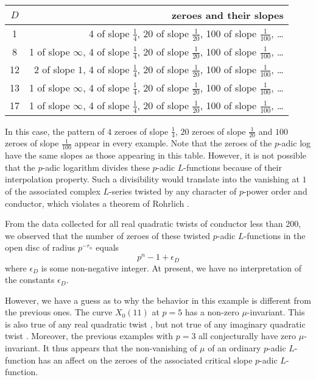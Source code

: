 \documentclass{amsart}
\theoremstyle{plain}
\theoremstyle{definition}
\begin{document}
\vspace{.2cm}

\begin{center}
\begin{tabular}{|c|r|}
\hline
$D$ & zeroes and their slopes\\
\hline
1 &
4 of slope $\frac{1}{4}$, 20  of slope $\frac{1}{20}$, 100  of slope $\frac{1}{100}$, \dots \\
\hline
8 &
1  of slope $\infty$, 4  of slope $\frac{1}{4}$, 20  of slope $\frac{1}{20}$, 100  of slope $\frac{1}{100}$, \dots \\
\hline
12 &
2 of slope $1$, 4 of slope $\frac{1}{4}$, 20  of slope $\frac{1}{20}$, 100  of slope $\frac{1}{100}$, \dots \\
\hline
13 &
1  of slope $\infty$, 4  of slope $\frac{1}{4}$, 20  of slope $\frac{1}{20}$, 100  of slope $\frac{1}{100}$, \dots\\
\hline
17 &
1  of slope $\infty$, 4  of slope $\frac{1}{4}$, 20  of slope $\frac{1}{20}$, 100  of slope $\frac{1}{100}$, \dots \\
\hline
\end{tabular}
\end{center}

\vspace{.2cm}

In this case, the pattern of $4$ zeroes of slope $\frac{1}{4}$, $20$ zeroes of slope $\frac{1}{20}$ and $100$ zeroes of slope $\frac{1}{100}$ appear in every example.  Note that the zeroes of the $p$-adic log have the same slopes as those appearing in this table.  However, it is not possible that the $p$-adic logarithm divides these $p$-adic $L$-functions because of their interpolation property.  Such a divisibility would translate into the vanishing at $1$ of the associated complex $L$-series twisted by any character of $p$-power order and conductor, which violates a theorem of Rohrlich \cite{Rohrlich}.
	
From the data collected for all real quadratic twists of conductor less than 200, we observed that the number of zeroes of these twisted $p$-adic $L$-functions in the open disc of radius $p^{-r_n}$ equals
$$
p^n - 1+ \epsilon_D
$$
where $\epsilon_D$ is some non-negative integer.  At present, we have no interpretation of the constants $\epsilon_D$.  

However, we have a guess as to why the behavior in this example is different from the previous ones.  The curve $X_0(11)$ at $p=5$ has a non-zero $\mu$-invariant.  This is also true of any real quadratic twist \cite[Theorem 1.3]{GV}, but not true of any imaginary quadratic twist \cite[Proposition 5.7]{G-CIME}.  Moreover, the previous examples with $p=3$ all conjecturally have zero $\mu$-invariant.  It thus appears that the non-vanishing of $\mu$ of an ordinary $p$-adic $L$-function has an affect on the zeroes of the associated critical slope $p$-adic $L$-function.
\end{document}
